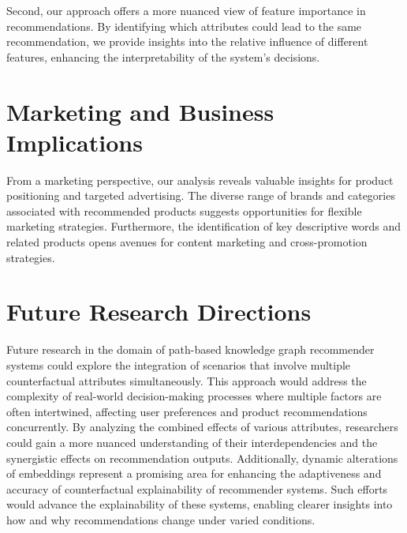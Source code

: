Second, our approach offers a more nuanced view of feature importance in
recommendations. By identifying which attributes could lead to the same recommendation,
we provide insights into the relative influence of different features, enhancing
the interpretability of the system's decisions.

\section{Marketing and Business Implications}
From a marketing perspective, our analysis reveals valuable insights for product
positioning and targeted advertising. The diverse range of brands and categories
associated with recommended products suggests opportunities for flexible marketing
strategies. Furthermore, the identification of key descriptive words and related
products opens avenues for content marketing and cross-promotion strategies.

\section{Future Research Directions}
Future research in the domain of path-based knowledge graph recommender systems could
explore the integration of scenarios that involve multiple counterfactual attributes
simultaneously. This approach would address the complexity of real-world
decision-making processes where multiple factors are often intertwined, affecting
user preferences and product recommendations concurrently. By analyzing the
combined effects of various attributes, researchers could gain a more nuanced understanding
of their interdependencies and the synergistic effects on recommendation outputs.
Additionally, dynamic alterations of embeddings represent a promising area for enhancing
the adaptiveness and accuracy of counterfactual explainability of recommender systems.
Such efforts would advance the explainability of these systems, enabling clearer
insights into how and why recommendations change under varied conditions.